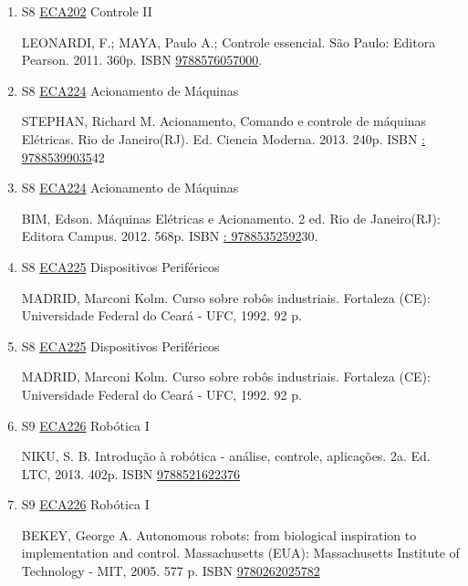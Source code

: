 \documentclass[12pt,a4paper]{book}
\begin{document}
\begin{enumerate}
 
 
 \item S8 \hyperref[PUD:ECA202]{ECA202} Controle II

  LEONARDI, F.;  MAYA, Paulo A.;  Controle essencial.  São Paulo: Editora Pearson.  2011.  360p.  ISBN \href{http://www.bn.br/site/pages/servicosProfissionais/agenciaISBN/isbnBusca/FbnBuscaISBNCatalogo.asp?pField=ISBN&pIntPagina=1&pISBN=76057000&nidbISBN=true&hidbISBN=true}{9788576057000}.
 \item S8 \hyperref[PUD:ECA224]{ECA224} Acionamento de Máquinas

 STEPHAN, Richard M.  Acionamento, Comando e controle de máquinas Elétricas.  Rio de Janeiro(RJ).  Ed.  Ciencia Moderna.  2013.  240p.  ISBN \href{http://www.google.com/search?hl=pt-BR&tbo=p&tbm=bks&q=isbn:: 97885399035&num=10}{: 97885399035}42
 
 
 \item S8 \hyperref[PUD:ECA224]{ECA224} Acionamento de Máquinas

 BIM, Edson.  Máquinas Elétricas e Acionamento.  2 ed.  Rio de Janeiro(RJ): Editora Campus.  2012.  568p.  ISBN \href{http://www.google.com/search?hl=pt-BR&tbo=p&tbm=bks&q=isbn:: 97885352592&num=10}{: 97885352592}30.
 \item S8 \hyperref[PUD:ECA225]{ECA225} Dispositivos Periféricos

 MADRID, Marconi Kolm.  Curso sobre robôs industriais.  Fortaleza (CE): Universidade Federal do Ceará - UFC, 1992.  92 p.
 \item S8 \hyperref[PUD:ECA225]{ECA225} Dispositivos Periféricos

 MADRID, Marconi Kolm.  Curso sobre robôs industriais.  Fortaleza (CE): Universidade Federal do Ceará - UFC, 1992.  92 p.
 \item S9 \hyperref[PUD:ECA226]{ECA226} Robótica I

  NIKU, S.  B.  Introdução à robótica - análise, controle, aplicações.  2a.  Ed.  LTC, 2013.  402p.  ISBN \href{http://www.bn.br/site/pages/servicosProfissionais/agenciaISBN/isbnBusca/FbnBuscaISBNCatalogo.asp?pField=ISBN&pIntPagina=1&pISBN=21622376&nidbISBN=true&hidbISBN=true}{9788521622376}
 
 
 \item S9 \hyperref[PUD:ECA226]{ECA226} Robótica I

 BEKEY, George A.  Autonomous robots: from biological inspiration to implementation and control.  Massachusetts (EUA): Massachusetts Institute of Technology - MIT, 2005.  577 p.   ISBN \href{http://www.isbnsearch.org/isbn/9780262025782}{9780262025782}
 

\end{enumerate}
\end{document}
